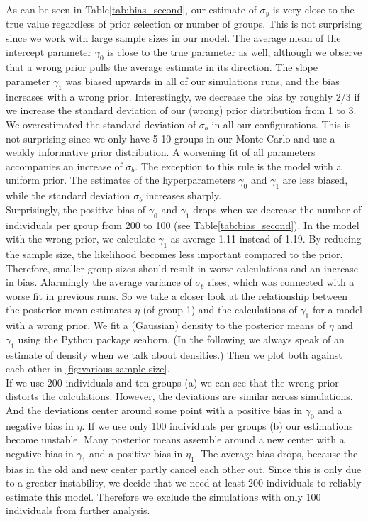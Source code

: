 As can be seen in Table\ref{tab:bias_second}, our estimate of $\sigma_y$ is very close to the true value regardless of prior selection or number of groups. This is not surprising since we work with large sample sizes in our model.
The average mean of the intercept parameter $\gamma_0$ is close to the true parameter as well, although we observe that a wrong prior pulls the average estimate in its direction.
The slope parameter $\gamma_1$ was biased upwards in all of our simulations runs, and the bias increases with a wrong prior. Interestingly, we decrease the bias by roughly 2/3 if we increase the standard deviation of our (wrong) prior distribution from 1 to 3. \\
We overestimated the standard deviation of $\sigma_b$ in all our configurations. This is not surprising since we only have 5-10 groups in our Monte Carlo and use a weakly informative prior distribution. A worsening fit of all parameters accompanies an increase of $\sigma_b$. The exception to this rule is the model with a uniform prior. The estimates of the hyperparameters $\gamma_0$ and $\gamma_1$ are less biased, while the standard deviation $\sigma_b$ increases sharply.\\
Surprisingly, the positive bias of $\gamma_0$ and $\gamma_1$ drops when we decrease the number of individuals per group from 200 to 100 (see Table\ref{tab:bias_second}). In the model with the wrong prior, we calculate $\gamma_1$ as average 1.11 instead of 1.19.
By reducing the sample size, the likelihood becomes less important compared to the prior. Therefore, smaller group sizes should result in worse calculations and an increase in bias. Alarmingly the average variance of $\sigma_b$ rises, which was connected with a worse fit in previous runs. So we take a closer look at the relationship between the posterior mean estimates $\eta$ (of group 1) and the calculations of $\gamma_1$ for a model with a wrong prior.
We fit a (Gaussian) density to the posterior means of $\eta$ and $\gamma_1$ using the Python package seaborn. (In the following we always speak of an estimate of density when we talk about densities.)
Then we plot both against each other in \ref{fig:various sample size}. \\
If we use 200 individuals and ten groups (a) we can see that the wrong prior distorts the calculations. However, the deviations are similar across simulations. And the deviations center around some point with a positive bias in $\gamma_0$ and a negative bias in $\eta$.
If we use only 100 individuals per groups (b) our estimations become unstable. Many posterior means assemble around a new center with a negative bias in $\gamma_1$ and a positive bias in $\eta_1$. The average bias drops, because the bias in the old and new center partly cancel each other out. Since this is only due to a greater instability, we decide that we need at least 200 individuals to reliably estimate this model. Therefore we exclude the simulations with only 100 individuals from further analysis.\\

